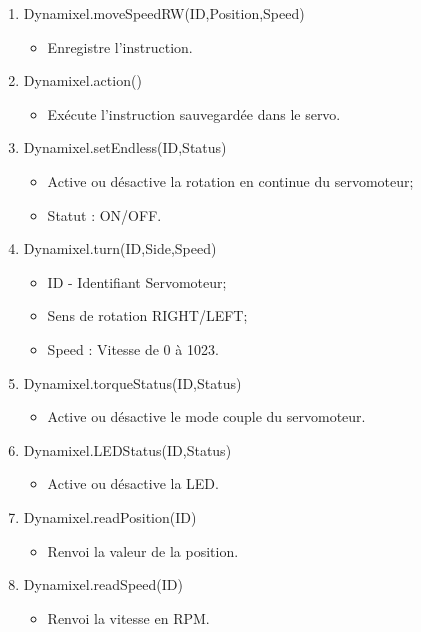 \begin{enumerate}
     \item Dynamixel.moveSpeedRW(ID,Position,Speed)
     \begin{itemize}
        \item Enregistre l’instruction.
     \end{itemize}
     
     \item Dynamixel.action()
     \begin{itemize}
        \item Exécute l’instruction sauvegardée dans le servo.
     \end{itemize}
     
     \item Dynamixel.setEndless(ID,Status)
     \begin{itemize}
        \item Active ou désactive la rotation en continue du servomoteur;
        \item Statut : ON/OFF.
     \end{itemize}
     
     \item Dynamixel.turn(ID,Side,Speed)
     \begin{itemize}
         \item ID - Identifiant Servomoteur;
         \item Sens de rotation RIGHT/LEFT;
         \item Speed : Vitesse de 0 à 1023.
     \end{itemize}
     
     \item Dynamixel.torqueStatus(ID,Status)
     \begin{itemize}
        \item Active ou désactive le mode couple du servomoteur.
     \end{itemize}
     
     \item Dynamixel.LEDStatus(ID,Status)
     \begin{itemize}
        \item Active ou désactive la LED.
     \end{itemize}
     
     \item Dynamixel.readPosition(ID)
     \begin{itemize}
        \item Renvoi  la valeur de la position.
     \end{itemize}
     
     \item Dynamixel.readSpeed(ID)
     \begin{itemize}
        \item Renvoi la vitesse en RPM.
     \end{itemize}
\end{enumerate}

